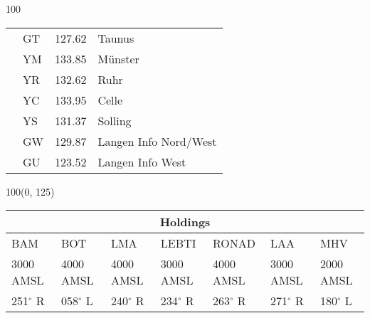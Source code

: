 \documentclass[10pt,landscape,a4paper]{article}
\begin{document}
\begin{textblock}{100}
\begin{table}[]
\begin{tabular}{llll}
\multicolumn{1}{|l|}{}                     & \multicolumn{1}{l|}{GT}          & \multicolumn{1}{l|}{127.62}            & \multicolumn{1}{l|}{Taunus}             \\
\multicolumn{1}{|l|}{}                     & \multicolumn{1}{l|}{YM}          & \multicolumn{1}{l|}{133.85}          & \multicolumn{1}{l|}{Münster}          \\
\multicolumn{1}{|l|}{}                     & \multicolumn{1}{l|}{YR}          & \multicolumn{1}{l|}{132.62}          & \multicolumn{1}{l|}{Ruhr}          \\
\multicolumn{1}{|l|}{}                     & \multicolumn{1}{l|}{YC}          & \multicolumn{1}{l|}{133.95}          & \multicolumn{1}{l|}{Celle}          \\
\multicolumn{1}{|l|}{}                     & \multicolumn{1}{l|}{YS}          & \multicolumn{1}{l|}{131.37}          & \multicolumn{1}{l|}{Solling}          \\
\multicolumn{1}{|l|}{}                     & \multicolumn{1}{l|}{GW}          & \multicolumn{1}{l|}{129.87}          & \multicolumn{1}{l|}{Langen Info Nord/West}          \\
\multicolumn{1}{|l|}{}                     & \multicolumn{1}{l|}{GU}          & \multicolumn{1}{l|}{123.52}          & \multicolumn{1}{l|}{Langen Info West}          \\ \hline
\end{tabular}
\end{table}
\end{textblock}

\begin{textblock}{100}(0, 125)
\begin{table}[]
\begin{tabular}{lllllll} 
\multicolumn{7}{c}{\textbf{Holdings}}                                                                                                                                        \\ \hline
\multicolumn{1}{|l|}{BAM} & 
\multicolumn{1}{l|}{BOT}   & 
\multicolumn{1}{l|}{LMA} & 
\multicolumn{1}{l|}{LEBTI} & 
\multicolumn{1}{l|}{RONAD} & 
\multicolumn{1}{l|}{LAA} &
\multicolumn{1}{l|}{MHV} \\ \hline
\multicolumn{1}{|l|}{3000 AMSL} & 
\multicolumn{1}{l|}{4000 AMSL} & 
\multicolumn{1}{l|}{4000 AMSL} & 
\multicolumn{1}{l|}{3000 AMSL} & 
\multicolumn{1}{l|}{4000 AMSL} & 
\multicolumn{1}{l|}{3000 AMSL} & 
\multicolumn{1}{l|}{2000 AMSL} \\
\multicolumn{1}{|l|}{251$^\circ$ R} & 
\multicolumn{1}{l|}{058$^\circ$ L} & 
\multicolumn{1}{l|}{240$^\circ$ R} & 
\multicolumn{1}{l|}{234$^\circ$ R} & 
\multicolumn{1}{l|}{263$^\circ$ R} & 
\multicolumn{1}{l|}{271$^\circ$ R} & 
\multicolumn{1}{l|}{180$^\circ$ L} \\ \hline
\end{tabular}
\end{table}
\end{textblock}
\end{document}
